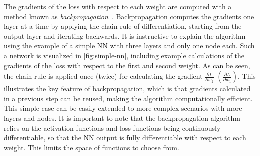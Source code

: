 The gradients of the loss with respect to each weight are computed with a method known as \emph{backpropagation}~\cite{Rumelhart_1986}. Backpropagation computes the gradients one layer at a time by applying the chain rule of differentiation, starting from the output layer and iterating backwards.
It is instructive to explain the algorithm using the example of a simple NN with three layers and only one node each. Such a network is visualized in \cref{fig:simple-nn}, including example calculations of the gradients of the loss with respect to the first and second weight.
As can be seen, the chain rule is applied once (twice) for calculating the gradient $\frac{\partial L}{\partial w_2}$ $\left( \frac{\partial L}{\partial w_1}\right)$. 
This illustrates the key feature of backpropagation, which is that gradients calculated in a previous step can be reused, making the algorithm computationally efficient.
This simple case can be easily extended to more complex scenarios with more layers and nodes.
It is important to note that the backpropagation algorithm relies on the activation functions and loss functions being continuously differentiable, so that the NN output is fully differentiable with respect to each weight. This limits the space of functions to choose from.

